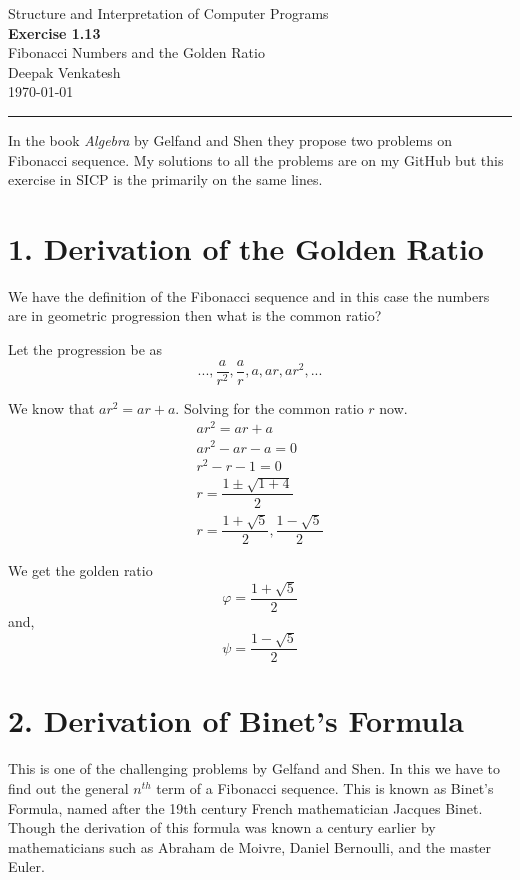 \documentclass[10pt,letterpaper]{article}
\begin{document}
\begin{center}
    {\small Structure and Interpretation of Computer Programs}\\[8pt]
    {\LARGE\bfseries Exercise 1.13}\\[6pt]
    {\large Fibonacci Numbers and the Golden Ratio}\\[12pt]
    {\normalsize Deepak Venkatesh}\\
    {\today}
\end{center}

\vspace{0.5em}
\hrule
\vspace{1em}

In the book \textit{Algebra} by Gelfand and Shen they propose two problems on Fibonacci sequence. My solutions 
to all the problems are on my GitHub but this exercise in SICP is the primarily on the same lines.


\section*{1. Derivation of the Golden Ratio}

We have the definition of the Fibonacci sequence and in this case the numbers are in geometric progression then what is the common ratio?

  Let the progression be as 
  \[
  ..., \dfrac{a}{r^2}, \dfrac{a}{r}, a, ar, ar^2,...
  \]

  We know that $ar^2 = ar + a$. Solving for the common ratio $r$ now.
  \begin{gather*}
    ar^2 = ar + a\\
    ar^2 - ar - a = 0\\
    r^2 - r - 1 = 0\\
    r = \dfrac{1 \pm \sqrt{1 + 4}}{2}\\
    r = \dfrac{1 + \sqrt{5}}{2}, \dfrac{1 - \sqrt{5}}{2}
  \end{gather*}


  We get the golden ratio\\
\[
\varphi = \frac{1 + \sqrt{5}}{2}
\]
and,  
\[
\psi = \frac{1 - \sqrt{5}}{2}
\]


\section*{2. Derivation of Binet's Formula}

  This is one of the challenging problems by Gelfand and Shen. In this we have to find out the general $n^{th}$ term of a Fibonacci sequence.
  This is known as Binet's Formula, named after the 19th century French mathematician Jacques Binet. Though the derivation
  of this formula was known a century earlier by mathematicians such as Abraham de Moivre, Daniel Bernoulli, and the master Euler.
\end{document}
